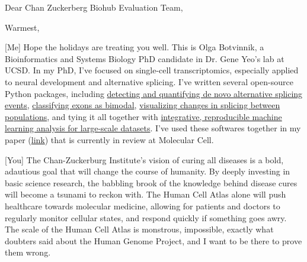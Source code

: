 \date{\today}
\opening{Dear Chan Zuckerberg Biohub Evaluation Team,}
\closing{Warmest,}
\makelettertitle


[Me] Hope the holidays are treating you well. This is Olga Botvinnik, a  Bioinformatics and Systems Biology PhD candidate in Dr. Gene Yeo’s lab at UCSD. In my PhD, I’ve focused on single-cell transcriptomics, especially applied to neural development and alternative splicing. I’ve written several open-source Python packages, including \href{https://github.com/YeoLab/outrigger}{detecting and quantifying de novo alternative splicing events}, \href{https://github.com/YeoLab/anchor}{classifying exons as bimodal}, \href{https://github.com/YeoLab/bonvoyage}{visualizing changes in splicing between populations}, and tying it all together with \href{https://github.com/YeoLab/flotilla/}{integrative, reproducible machine learning analysis for large-scale datasets}. I’ve used these softwares together in my paper (\href{https://drive.google.com/file/d/0B44mjlWGbPILeUJVdWMtb0xDWDg/view?usp=sharing}{link}) that is currently in review at Molecular Cell.

[You] The Chan-Zuckerburg Institute’s vision of curing all diseases is a bold, adautious goal that will change
the course of humanity. By deeply investing in basic science research, the babbling brook of the
knowledge behind disease cures will become a tsunami to reckon with. The Human Cell Atlas alone
will push healthcare towards molecular medicine, allowing for patients and doctors to regularly
monitor cellular states, and respond quickly if something goes awry. The scale of the Human Cell
Atlas is monstrous, impossible, exactly what doubters said about the Human Genome Project, and I
want to be there to prove them wrong.

